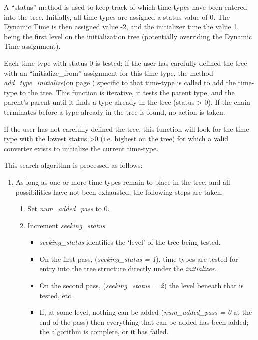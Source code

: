 {\begin{enumerate}
{\begin{enumerate}
A {\textquotedblleft}status{\textquotedblright} method is used to keep
track of which time-types have been entered into the tree.  Initially,
all time-types are assigned a status value of 0.  The Dynamic Time is
then assigned value -2, and the initializer time the value 1, being the
first level on the initialization tree (potentially overriding the
Dynamic Time assignment).

Each time-type with status 0 is tested; if the user has carefully
defined the tree with an
{\textquotedblleft}initialize\_from{\textquotedblright} assignment for
this time-type, the method \textit{add\_type\_initialize}(on page
\pageref{ref:addtypeinitialize})
specific to
that time-type is called to add the time-type to the tree.  This
function is iterative, it tests the parent type, and the
parent's parent until it finds a type already in the
tree (status {\textgreater} 0).  If the chain terminates before a type
already in the tree is found, no action is taken.

If the user has not carefully defined the tree, this function will look
for the time-type with the lowest status {\textgreater}0 (i.e. highest
on the tree) for which a valid converter exists to initialize the
current time-type.

This search algorithm is processed as follows:

{\begin{enumerate}
\item As long as one or more time-types remain to place in the tree, and all
possibilities have not been exhausted, the following steps are taken.

{\begin{enumerate}
\item Set \textit{num\_added\_pass} to 0.
\item Increment \textit{seeking\_status}
\begin{itemize}
\item \textit{seeking\_status} identifies the `level' of the
tree being tested.
\item On the first pass, (\textit{seeking\_status = 1}),
time-types are tested for entry into the tree structure
directly under the \textit{initializer}.
\item On the second pass, (\textit{seeking\_status = 2}) the level beneath
that is tested, etc.
\item If, at some level, nothing can be added (\textit{num\_added\_pass  = 0}
at the end of
the pass) then everything that can be added has been added; the algorithm is
complete, or it has failed.
\end{itemize}


\end{enumerate}}
\end{enumerate}}
\end{enumerate}}
\end{enumerate}}
